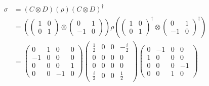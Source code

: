 \begin{equation}
\begin{split}
    \sigma&=(C\otimes D)(\rho)(C\otimes D)^\dagger\\
    &=(\begin{pmatrix}1&0\\0&1\end{pmatrix}\otimes\begin{pmatrix}0&1\\-1&0\end{pmatrix})\rho(\begin{pmatrix}1&0\\0&1\end{pmatrix}^\dagger\otimes\begin{pmatrix}0&1\\-1&0\end{pmatrix}^\dagger)\\
    &=\begin{pmatrix}0&1&0&0\\-1&0&0&0\\0&0&0&1\\0&0&-1&0\end{pmatrix}\begin{pmatrix}\frac{1}{2} & 0 & 0 & -\frac{i}{2} \\0 & 0 & 0 & 0 \\0 & 0 & 0 & 0 \\\frac{i}{2} & 0 & 0 & \frac{1}{2} \end{pmatrix}\begin{pmatrix}0&-1&0&0\\1&0&0&0\\0&0&0&-1\\0&0&1&0\end{pmatrix}\\
\end{split}
\end{equation}

